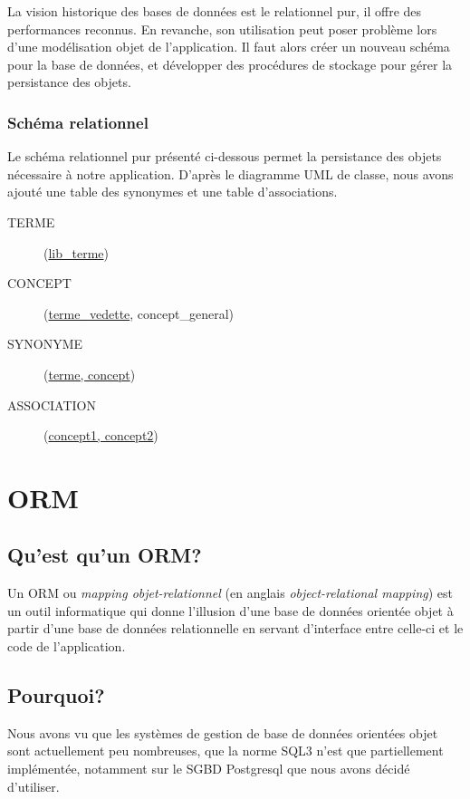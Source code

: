 La vision historique des bases de données est le relationnel pur, il offre des performances reconnus. En revanche, son utilisation peut poser problème lors d'une modélisation objet de l'application. Il faut alors créer un nouveau schéma pour la base de données, et développer des procédures de stockage pour gérer la persistance des objets.

\subsubsection{Schéma relationnel}

Le schéma relationnel pur présenté ci-dessous permet la persistance des objets nécessaire à notre application. D'après le diagramme UML de classe, nous avons ajouté une table des synonymes et une table d'associations.

\begin{description}
\item[TERME](\underline{lib\_terme})
\item[CONCEPT](\underline{terme\_vedette}\up{\#}, concept\_general\up{\#})
\item[SYNONYME](\underline{terme\up{\#}, concept\up{\#}})
\item[ASSOCIATION](\underline{concept1\up{\#}, concept2\up{\#}})
\end{description}

\section{ORM}

	\subsection{Qu'est qu'un ORM?}
    Un ORM ou \emph{mapping objet-relationnel} (en anglais \emph{object-relational mapping}) est un outil informatique qui donne l'illusion d'une base de données orientée objet à partir d'une base de données relationnelle en servant d'interface entre celle-ci et le code de l'application.
   
	\subsection{Pourquoi?}
    Nous avons vu que les systèmes de gestion de base de données orientées objet sont actuellement peu nombreuses, que la norme SQL3 n'est que partiellement implémentée, notamment sur le SGBD Postgresql que nous avons décidé d'utiliser.
    
